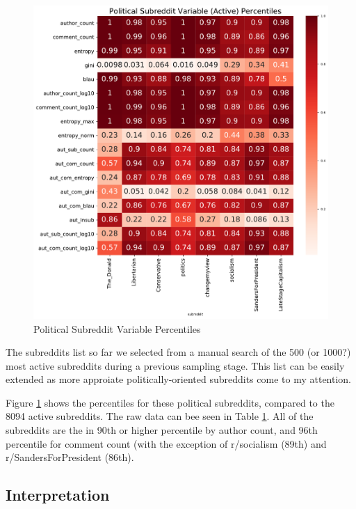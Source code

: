 \documentclass{article}
\begin{document}
\begin{figure}
    \centering
    \includegraphics[width=\textwidth]{latex/pol-heatmap.pdf}
    \caption{Political Subreddit Variable Percentiles}
    \label{pol-heatmap}
\end{figure}

The subreddits list so far we selected from a manual search of the 500 (or 1000?) most active subreddits during a previous sampling stage. This list can be easily extended as more approiate politically-oriented subreddits come to my attention.

Figure \ref{pol-heatmap} shows the percentiles for  these political subreddits, compared to the 8094 active subreddits. The raw data can bee seen in Table \ref{pol-heatmap}. All of the subreddits are the in 90th or higher percentile by author count, and 96th percentile for comment count (with the exception of r/socialism (89th) and r/SandersForPresident (86th). 

\subsection{Interpretation}
\end{document}
